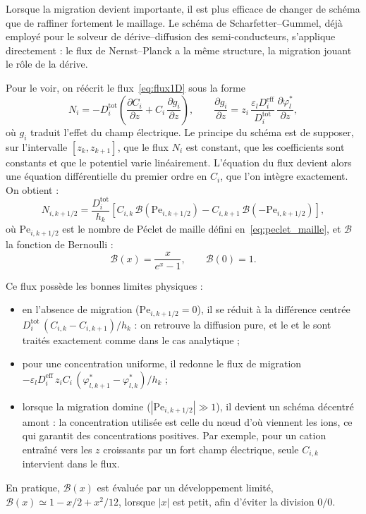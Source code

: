 Lorsque la migration devient importante, il est plus
efficace de changer de schéma que de raffiner fortement le maillage. Le
schéma de Scharfetter--Gummel, déjà employé pour le solveur de
dérive--diffusion des semi-conducteurs, s'applique directement : le flux de
Nernst--Planck a la même structure, la migration jouant le rôle de la dérive.

Pour le voir, on réécrit le flux~\eqref{eq:flux1D} sous la forme
\begin{equation}
N_i = -D_i^{\mathrm{tot}}\left(\frac{\partial C_i}{\partial z}
+ C_i\,\frac{\partial g_i}{\partial z}\right),
\qquad
\frac{\partial g_i}{\partial z} =
z_i\,\frac{\varepsilon_l D_i^{\mathrm{eff}}}{D_i^{\mathrm{tot}}}\,
\frac{\partial \varphi_l^*}{\partial z} ,
\end{equation}
où $g_i$ traduit l'effet du champ électrique. Le
principe du schéma est de supposer, sur l'intervalle $[z_k, z_{k+1}]$, que le
flux $N_i$ est constant, que les coefficients sont constants et que le
potentiel varie linéairement. L'équation du flux devient alors une équation
différentielle du premier ordre en $C_i$, que l'on intègre exactement. On
obtient :
\begin{equation}
N_{i,k+1/2} =
\frac{D_i^{\mathrm{tot}}}{h_k}
\left[
C_{i,k}\,\mathcal{B}(\mathrm{Pe}_{i,k+1/2}) - C_{i,k+1}\,\mathcal{B}(-\mathrm{Pe}_{i,k+1/2})
\right],
\label{eq:SG}
\end{equation}
où $\mathrm{Pe}_{i,k+1/2}$ est le nombre de Péclet de maille
défini en~\eqref{eq:peclet_maille}, et $\mathcal{B}$ la fonction de Bernoulli :
\begin{equation}
\mathcal{B}(x) = \frac{x}{e^{x} - 1}, \qquad \mathcal{B}(0) = 1 .
\end{equation}

Ce flux possède les bonnes limites physiques :
\begin{itemize}
    \item en l'absence de migration ($\mathrm{Pe}_{i,k+1/2} = 0$), il se réduit
    à la différence centrée
    $D_i^{\mathrm{tot}}\,(C_{i,k} - C_{i,k+1})/h_k$ : on retrouve
    la diffusion pure, et le  et le  sont traités exactement
    comme dans le cas analytique ;
    \item pour une concentration uniforme, il redonne le flux de migration
    $-\varepsilon_l D_i^{\mathrm{eff}}\, z_i C_i\,
    (\varphi_{l,k+1}^* - \varphi_{l,k}^*)/h_k$ ;
    \item lorsque la migration domine ($|\mathrm{Pe}_{i,k+1/2}| \gg 1$), il
    devient un schéma décentré amont : la concentration utilisée est celle du
    nœud d'où viennent les ions, ce qui garantit des concentrations
    positives. Par exemple, pour un cation entraîné vers les $z$ croissants
    par un fort champ électrique, seule $C_{i,k}$ intervient dans le flux.
\end{itemize}
En pratique, $\mathcal{B}(x)$ est évaluée par un développement limité,
$\mathcal{B}(x) \simeq 1 - x/2 + x^2/12$, lorsque $|x|$ est petit, afin d'éviter la
division $0/0$.

